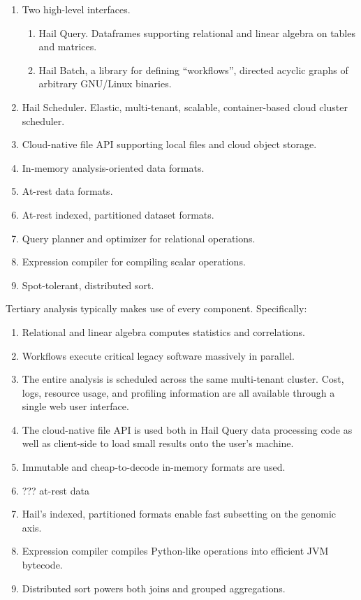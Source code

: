 \documentclass[sigconf, nonacm]{acmart}
\begin{document}
\begin{enumerate}
\item Two high-level interfaces.
  \begin{enumerate}
  \item Hail Query. Dataframes supporting relational and linear algebra on tables and matrices.
  \item Hail Batch, a library for defining ``workflows'', directed acyclic graphs of arbitrary
    GNU/Linux binaries.
  \end{enumerate}
\item Hail Scheduler. Elastic, multi-tenant, scalable, container-based cloud cluster scheduler.
\item Cloud-native file API supporting local files and cloud object storage.
\item In-memory analysis-oriented data formats.
\item At-rest data formats.
\item At-rest indexed, partitioned dataset formats.
\item Query planner and optimizer for relational operations.
\item Expression compiler for compiling scalar operations.
\item Spot-tolerant, distributed sort.
\end{enumerate}

Tertiary analysis typically makes use of every component. Specifically:

\begin{enumerate}
\item Relational and linear algebra computes statistics and correlations.
\item Workflows execute critical legacy software massively in parallel.
\item The entire analysis is scheduled across the same multi-tenant cluster. Cost, logs, resource
  usage, and profiling information are all available through a single web user interface.
\item The cloud-native file API is used both in Hail Query data processing code as well as
  client-side to load small results onto the user's machine.
\item Immutable and cheap-to-decode in-memory formats are used.
\item ??? at-rest data
\item Hail's indexed, partitioned formats enable fast subsetting on the genomic axis.
\item Expression compiler compiles Python-like operations into efficient JVM bytecode.
\item Distributed sort powers both joins and grouped aggregations.
\end{enumerate}
\end{document}

